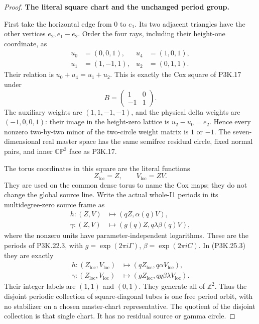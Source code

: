 \begin{proof}
\par\medskip\noindent\textbf{The literal square chart and the unchanged period group.}\enspace

First take the horizontal edge from \(0\) to \(e_1\). Its two
adjacent triangles have the other vertices \(e_2,e_1-e_2\).
Order the four rays, including their height-one coordinate, as
\[
\begin{aligned}
 u_0&=(0,0,1),&u_4&=(1,0,1),\\
 u_1&=(1,-1,1),&u_2&=(0,1,1).
\end{aligned}
                                                        \tag{P3K.25.2}
\]
Their relation is \(u_0+u_4=u_1+u_2\). This is exactly the Cox
square of P3K.17 under
\[
 B=\begin{pmatrix}1&0\\-1&1\end{pmatrix}.
\]
The auxiliary weights are \((1,1,-1,-1)\), and the physical
delta weights are \((-1,0,0,1)\): their image in the height-zero
lattice is \(u_2-u_0=e_2\). Hence every nonzero two-by-two
minor of the two-circle weight matrix is \(1\) or \(-1\).
The seven-dimensional real master space has the same semifree
residual circle, fixed normal pairs, and inner \(\mathbb{CP}^3\)
face as P3K.17.

The torus coordinates in this square are the literal functions
\[
                  Z_{\mathrm{loc}}=Z,\qquad
                  V_{\mathrm{loc}}=ZV.                 \tag{P3K.25.3}
\]
They are used on the common dense torus to name the Cox maps;
they do not change the global source line. Write the actual
whole-I1 periods in its multidegree-zero source frame as
\[
\begin{aligned}
 h:(Z,V)&\longmapsto(qZ,\alpha(q)V),\\
 \gamma:(Z,V)&\longmapsto(g(q)Z,q\lambda\beta(q)V),
\end{aligned}
                                                        \tag{P3K.25.4}
\]
where the nonzero units have parameter-independent logarithms.
These are the periods of P3K.22.3, with
\(g=\exp(2\pi i\Gamma)\), \(\beta=\exp(2\pi iC)\).
In (P3K.25.3) they are exactly
\[
\begin{aligned}
 h:(Z_{\mathrm{loc}},V_{\mathrm{loc}})
       &\longmapsto(qZ_{\mathrm{loc}},q\alpha V_{\mathrm{loc}}),\\
 \gamma:(Z_{\mathrm{loc}},V_{\mathrm{loc}})
       &\longmapsto(gZ_{\mathrm{loc}},
                          qg\beta\lambda V_{\mathrm{loc}}).
\end{aligned}
                                                        \tag{P3K.25.5}
\]
Their integer labels are \((1,1)\) and \((0,1)\).
They generate all of \(\mathbb Z^2\). Thus the disjoint periodic
collection of square-diagonal tubes is one free period orbit,
with no stabilizer on a chosen master-chart representative.
The quotient of the disjoint collection is that single chart.
It has no residual source or gamma circle.


\end{proof}
